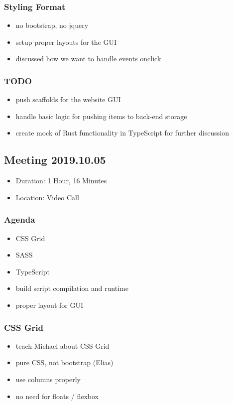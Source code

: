 \documentclass[11pt]{article}
\begin{document}
\subsubsection*{Styling Format}
\label{sec:org5c8c615}
\begin{itemize}
\item no bootstrap, no jquery
\item setup proper layouts for the GUI
\item discussed how we want to handle events onclick
\end{itemize}
\subsubsection*{{\bfseries\sffamily TODO} }
\label{sec:org8a098b7}
\begin{itemize}
\item push scaffolds for the website GUI
\item handle basic logic for pushing items to back-end storage
\item create mock of Rust functionality in TypeScript for further discussion
\end{itemize}
\subsection{Meeting 2019.10.05}
\label{sec:orgaa032e1}
\begin{itemize}
\item Duration: 1 Hour, 16 Minutes
\item Location: Video Call
\end{itemize}
\subsubsection*{Agenda}
\label{sec:org624b94d}
\begin{itemize}
\item CSS Grid
\item SASS
\item TypeScript
\item build script compilation and runtime
\item proper layout for GUI
\end{itemize}
\subsubsection*{CSS Grid}
\label{sec:org7fa4823}
\begin{itemize}
\item teach Michael about CSS Grid
\item pure CSS, not bootstrap (Elias)
\item use columns properly
\item no need for floats / flexbox
\end{itemize}
\end{document}
